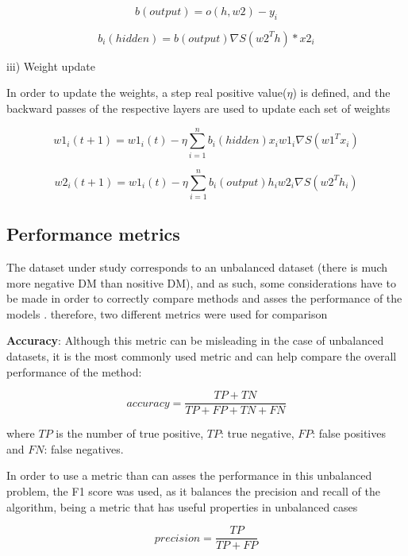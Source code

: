\documentclass[10pt,twocolumn,letterpaper]{article}
\begin{document}
\begin{equation}
b(output) = o(h,w2) - y_i
\end{equation}

\begin{equation}
b_i(hidden) = b(output) \nabla S(w2^T h)*x2_i
\end{equation}

iii) Weight update

In order to update the weights, a step real positive value($\eta$) is defined, and the backward passes of the respective layers are used to update each set of weights

\begin{equation}
w1_i(t+1) = w1_i(t) - \eta \sum_{i=1}^{n} b_i(hidden) x_i w1_i \nabla S(w1^T x_i)
\end{equation}

\begin{equation}
w2_i(t+1) = w1_i(t) - \eta \sum_{i=1}^{n} b_i(output) h_i w2_i \nabla S(w2^T h_i)
\end{equation}

\subsection{Performance metrics}

The dataset under study corresponds to an unbalanced dataset (there is much more negative DM than nositive DM), and as such, some considerations have to be made in order to correctly compare methods and asses the performance of the models \cite{Hoens2013}. therefore, two different metrics were used for comparison

\textbf{Accuracy}: Although this metric can be misleading in the case of unbalanced datasets, it is the most commonly used metric \cite{Hoens2013} and can help compare the overall performance of the method:

\begin{equation}
accuracy = \frac{TP+TN}{TP+FP+TN+FN}
\end{equation}

where $TP$ is the number of true positive, $TP$: true negative, $FP$: false positives and $FN$: false negatives.

In order to use a metric than can asses the performance in this unbalanced problem, the F1 score was used, as it balances the precision and recall of the algorithm, being a metric that has useful properties in unbalanced cases \cite{Hoens2013}

\begin{equation}
precision = \frac{TP}{TP+FP}
\end{equation}
\end{document}
